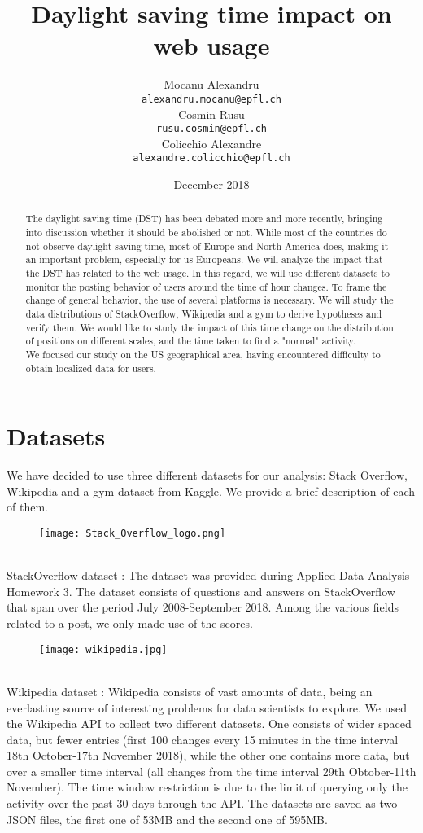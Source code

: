\documentclass[11pt]{article}
\title{Daylight saving time impact on web usage}
\author{Mocanu Alexandru \\
    {\tt {\small alexandru.mocanu@epfl.ch}} \\
    \And
    Cosmin Rusu \\
    {\tt {\small rusu.cosmin@epfl.ch}} \\
    \And
    Colicchio Alexandre \\
    {\tt {\small alexandre.colicchio@epfl.ch}} \\}
\date{December 2018}
\begin{document}
\maketitle
\begin{abstract}
  The daylight saving time (DST) has been debated more and more recently, bringing into discussion whether it should be abolished or not. While most of the countries do not observe daylight saving time, most of Europe and North America does, making it an important problem, especially for us Europeans. We will analyze the impact that the DST has related to the web usage. In this regard, we will use different datasets to monitor the posting behavior of users around the time of hour changes. To frame the change of general behavior, the use of several platforms is necessary. We will study the data distributions of StackOverflow, Wikipedia and a gym to derive hypotheses and verify them. We would like to study the impact of this time change on the distribution of positions on different scales, and the time taken to find a "normal" activity.\\
  We focused our study on the US geographical area, having encountered difficulty to obtain localized data for users.
\end{abstract}

\section*{Datasets}
We have decided to use three different datasets for our analysis: Stack Overflow, Wikipedia and a gym dataset from Kaggle. We provide a brief description of each of them.
\begin{figure}[h]
\centering
\texttt{[image: Stack\_Overflow\_logo.png]}
\end{figure}\\
StackOverflow dataset : The dataset was provided during Applied Data Analysis Homework 3. The dataset consists of questions and answers on StackOverflow that span over the period July 2008-September 2018. Among the various fields related to a post, we only made use of the scores.\\
\begin{figure}[h]
\centering
\texttt{[image: wikipedia.jpg]}
\end{figure}\\
Wikipedia dataset : Wikipedia consists of vast amounts of data, being an everlasting source of interesting problems for data scientists to explore. We used the Wikipedia API to collect two different datasets. One consists of wider spaced data, but fewer entries (first 100 changes every 15 minutes in the time interval 18th October-17th November 2018), while the other one contains more data, but over a smaller time interval (all changes from the time interval 29th Obtober-11th November). The time window restriction is due to the limit of querying only the activity over the past 30 days through the API. The datasets are saved as two JSON files, the first one of 53MB and the second one of 595MB.\\
\end{document}
